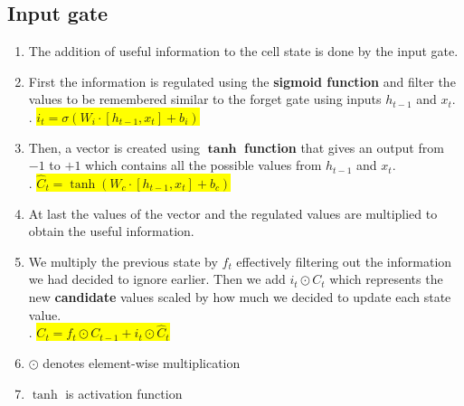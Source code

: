 \subsection{Input gate}

\begin{enumerate}
    \item The addition of useful information to the cell state is done by the input gate.
    \hfill \cite{geeksforgeeks/deep-learning/deep-learning-introduction-to-long-short-term-memory}

    \item First the information is regulated using the \textbf{sigmoid function} and filter the values to be remembered similar to the forget gate using inputs $h_{t-1}$ and $x_t$. 
    \hfill \cite{geeksforgeeks/deep-learning/deep-learning-introduction-to-long-short-term-memory}
    \\[0.2cm]
    .\hfill
    \colorbox{yellow}{$ i_t=\sigma(W_i\cdot [h_{t-1},x_t]+b_i) $}
    \hfill \cite{geeksforgeeks/deep-learning/deep-learning-introduction-to-long-short-term-memory}
    
    \item Then, a vector is created using $\bm{\tanh}$ \textbf{function} that gives an output from $-1$ to $+1$ which contains all the possible values from $h_{t-1}$ and $x_t$. 
    \hfill \cite{geeksforgeeks/deep-learning/deep-learning-introduction-to-long-short-term-memory}
    \\[0.2cm]
    .\hfill
    \colorbox{yellow}{$ \hat{C}_t=\tanh(W_c\cdot[h_{t-1},x_t]+b_c) $}
    \hfill \cite{geeksforgeeks/deep-learning/deep-learning-introduction-to-long-short-term-memory}
    
    \item At last the values of the vector and the regulated values are multiplied to obtain the useful information. 
    \hfill \cite{geeksforgeeks/deep-learning/deep-learning-introduction-to-long-short-term-memory}

    \item We multiply the previous state by $f_t$ effectively filtering out the information we had decided to ignore earlier. 
    Then we add $i_t \odot C_t$ which represents the new \textbf{candidate} values scaled by how much we decided to update each state value.
    \hfill \cite{geeksforgeeks/deep-learning/deep-learning-introduction-to-long-short-term-memory}
    \\[0.2cm]
    .\hfill
    \colorbox{yellow}{$ C_t=f_t \odot C_{t-1}+i_t \odot \hat{C}_t $}
    \hfill \cite{geeksforgeeks/deep-learning/deep-learning-introduction-to-long-short-term-memory}

    \item $\odot$ denotes element-wise multiplication
    \hfill \cite{geeksforgeeks/deep-learning/deep-learning-introduction-to-long-short-term-memory}

    \item $\tanh$ is activation function
    \hfill \cite{geeksforgeeks/deep-learning/deep-learning-introduction-to-long-short-term-memory}
\end{enumerate}





